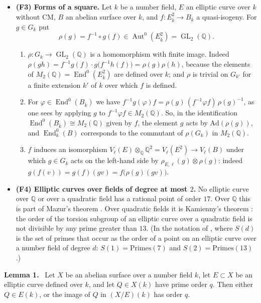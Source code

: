 \documentclass[11pt]{article}
\newenvironment{statement}[1]{\par\medskip\noindent\phantomsection\textbf{#1}\ }{\par\medskip}
\newcommand{\Q}{\mathbb Q}
\DeclareMathOperator{\End}{End}
\DeclareMathOperator{\GL}{GL}
\begin{document}
\begin{itemize}
\item \textbf{(F3) Forms of a square.} Let \(k\) be a number field, \(E\) an elliptic curve over
\(k\) without CM, \(B\) an abelian surface over \(k\), and \(f:E^2_{\bar k}\to B_{\bar k}\) a
quasi-isogeny. For \(g\in G_k\) put
\[\rho(g)=f^{-1}\circ g(f)\in\operatorname{Aut}^0(E^2_{\bar k})=\GL_2(\Q).\]
\begin{enumerate}
\item[(i)] \(\rho:G_k\to\GL_2(\Q)\) is a homomorphism with finite image. Indeed
\(\rho(gh)=f^{-1}g(f)\cdot g\bigl(f^{-1}h(f)\bigr)=\rho(g)\rho(h)\), because the elements of
\(M_2(\Q)=\End^0(E^2_{\bar k})\) are defined over \(k\); and \(\rho\) is trivial on \(G_{k'}\)
for a finite extension \(k'\) of \(k\) over which \(f\) is defined.
\item[(ii)] For \(\varphi\in\End^0(B_{\bar k})\) we have
\(f^{-1}g(\varphi)f=\rho(g)\,(f^{-1}\varphi f)\,\rho(g)^{-1}\), as one sees by applying \(g\) to
\(f^{-1}\varphi f\in M_2(\Q)\). So, in the identification \(\End^0(B_{\bar k})\cong M_2(\Q)\)
given by \(f\), the element \(g\) acts by \(\mathrm{Ad}(\rho(g))\), and \(\End^0_k(B)\)
corresponds to the commutant of \(\rho(G_k)\) in \(M_2(\Q)\).
\item[(iii)] \(f\) induces an isomorphism \(V_\ell(E)\otimes_{\Q}\Q^2=V_\ell(E^2)\to V_\ell(B)\)
under which \(g\in G_k\) acts on the left-hand side by \(\rho_{E,\ell}(g)\otimes\rho(g)\):
indeed \(g(f(v))=g(f)(gv)=f\bigl(\rho(g)(gv)\bigr)\).
\end{enumerate}

\item \textbf{(F4) Elliptic curves over fields of degree at most \(2\).} No elliptic curve over
\(\Q\) or over a quadratic field has a rational point of order \(17\). Over \(\Q\) this is part
of Mazur's theorem \cite[Theorem~(8)]{Maz}. Over quadratic fields it is Kamienny's theorem
\cite[Theorem~3.1]{Kam}: the order of the torsion subgroup of an elliptic curve over a quadratic field is not
divisible by any prime greater than \(13\). (In the notation of \cite[Section~1]{DKSS}, where
\(S(d)\) is the set of primes that occur as the order of a point on an elliptic curve over a
number field of degree \(d\): \(S(1)=\mathrm{Primes}(7)\) and \(S(2)=\mathrm{Primes}(13)\).)
\end{itemize}

\begin{statement}{Lemma 1.}\label{lemma-sequence}
Let \(X\) be an abelian surface over a number field \(k\), let \(E\subset X\) be an elliptic
curve defined over \(k\), and let \(Q\in X(k)\) have prime order \(q\). Then either
\(Q\in E(k)\), or the image of \(Q\) in \((X/E)(k)\) has order \(q\).
\end{statement}
\end{document}
